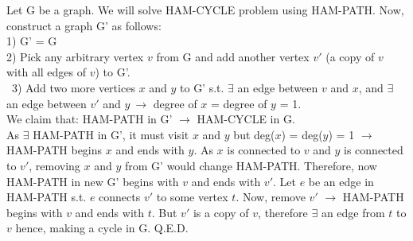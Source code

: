\documentclass{article}
\begin{document}
Let G be a graph. We will solve HAM-CYCLE problem using HAM-PATH. Now, construct a graph G' as follows: \\
1) G' = G \\
2) Pick any arbitrary vertex $v$ from G and add another vertex $v'$ (a copy of $v$ with all edges of $v$) to G'. \\\
3) Add two more vertices $x$ and $y$ to G' s.t. $\exists$ an edge between $v$ and $x$, and $\exists$ an edge between $v'$ and $y\ \rightarrow$ degree of $x$ = degree of $y$ = 1. \\
We claim that: HAM-PATH in G' $\rightarrow$ HAM-CYCLE in G. \\
As $\exists$ HAM-PATH in G', it must visit $x$ and $y$ but deg($x$) = deg($y$) = 1 $\rightarrow$ HAM-PATH begins $x$ and ends with $y$. As $x$ is connected to $v$ and $y$ is connected to $v'$, removing $x$ and $y$ from G' would change HAM-PATH. Therefore, now HAM-PATH in new G' begins with $v$ and ends with $v'$. Let $e$ be an edge in HAM-PATH s.t. $e$ connects $v'$ to some vertex $t$. Now, remove $v'$ $\rightarrow$ HAM-PATH begins with $v$ and ends with $t$. But $v'$ is a copy of $v$, therefore $\exists$ an edge from $t$ to $v$ hence, making a cycle in G. Q.E.D.
\end{document}
